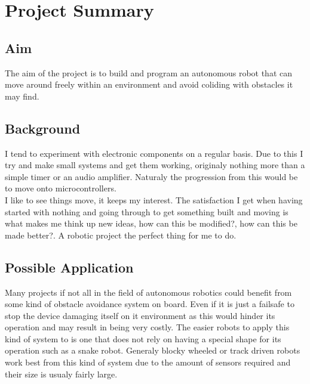 \documentclass[11pt,fleqn,twoside]{article}
\begin{document}

\mmp

\setcounter{tocdepth}{3} %
\tableofcontents

\newpage

\section{Project Summary}
\subsection{Aim}
The aim of the project is to build and program an autonomous robot that can move around freely within an environment and avoid coliding with obstacles it may find.
\subsection{Background}
I tend to experiment with electronic components on a regular basis.  Due to this I try and make small systems and get them working, originaly nothing more than a simple timer or an audio amplifier.  Naturaly the progression from this would be to move onto microcontrollers.
\\I like to see things move, it keeps my interest.  The satisfaction I get when having started with nothing and going through to get something built and moving is what makes me think up new ideas, how can this be modified?, how can this be made better?.  A robotic project the perfect thing for me to do.
\subsection{Possible Application}
Many projects if not all in the field of autonomous robotics could benefit from some kind of obstacle avoidance system on board.  Even if it is just a failsafe to stop the device damaging itself on it environment as this would hinder its operation and may result in being very costly.  The easier robots to apply this kind of system to is one that does not rely on having a special shape for its operation \cite{snake} such as a snake robot.  Generaly blocky wheeled or track driven robots work best from this kind of system due to the amount of sensors required and their size is usualy fairly large.
\end{document}
